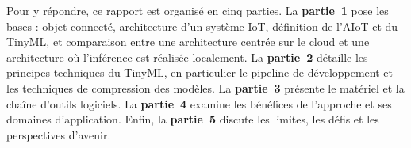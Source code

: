 Pour y répondre, ce rapport est organisé en cinq parties. La
\textbf{partie~1} pose les bases : objet connecté, architecture d'un système IoT,
définition de l'AIoT et du TinyML, et comparaison entre une architecture centrée
sur le cloud et une architecture où l'inférence est réalisée localement. La
\textbf{partie~2} détaille les principes techniques du TinyML, en particulier
le pipeline de développement et les techniques de compression des modèles. La
\textbf{partie~3} présente le matériel et la chaîne d'outils logiciels. La
\textbf{partie~4} examine les bénéfices de l'approche et ses domaines
d'application. Enfin, la \textbf{partie~5} discute les limites, les défis et les
perspectives d'avenir.

